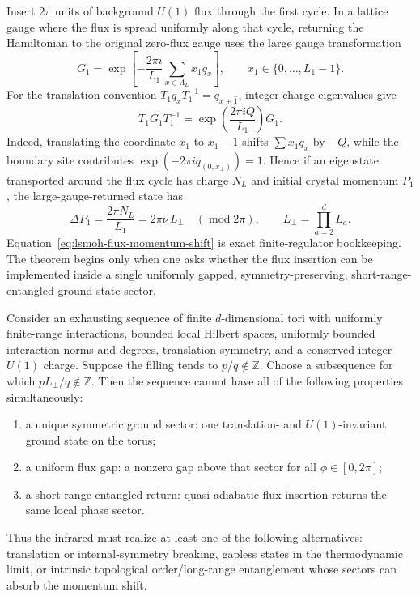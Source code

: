 Insert \(2\pi\) units of background \(U(1)\) flux through the first cycle.  In a
lattice gauge where the flux is spread uniformly along that cycle, returning
the Hamiltonian to the original zero-flux gauge uses the large gauge
transformation
\begin{equation}
  G_1
  =
  \exp\!\left[
    -\frac{2\pi i}{L_1}
    \sum_{x\in\Lambda_L}x_1 q_x
  \right],
  \qquad x_1\in\{0,\ldots,L_1-1\}.
  \label{eq:lsmoh-large-gauge-transformation}
\end{equation}
For the translation convention \(T_1q_xT_1^{-1}=q_{x+\widehat 1}\), integer
charge eigenvalues give
\begin{equation}
  T_1G_1T_1^{-1}
  =
  \exp\!\left(\frac{2\pi iQ}{L_1}\right)G_1 .
  \label{eq:lsmoh-translation-large-gauge-commutator}
\end{equation}
Indeed, translating the coordinate \(x_1\) to \(x_1-1\) shifts
\(\sum x_1q_x\) by \(-Q\), while the boundary site contributes
\(\exp(-2\pi i q_{(0,x_\perp)})=1\).  Hence if an eigenstate transported around
the flux cycle has charge \(N_L\) and initial crystal momentum \(P_1\), the
large-gauge-returned state has
\begin{equation}
  \Delta P_1
  =
  \frac{2\pi N_L}{L_1}
  =
  2\pi\nu\,L_\perp
  \quad(\operatorname{mod}2\pi),
  \qquad
  L_\perp=\prod_{a=2}^d L_a .
  \label{eq:lsmoh-flux-momentum-shift}
\end{equation}
Equation~\eqref{eq:lsmoh-flux-momentum-shift} is exact finite-regulator
bookkeeping.  The theorem begins only when one asks whether the flux insertion
can be implemented inside a single uniformly gapped, symmetry-preserving,
short-range-entangled ground-state sector.

\begin{theorem}
\label{thm:lsmoh-obstruction-theorem-boundary}
Consider an exhausting sequence of finite \(d\)-dimensional tori with uniformly
finite-range interactions, bounded local Hilbert spaces, uniformly bounded
interaction norms and degrees, translation symmetry, and a conserved integer
\(U(1)\) charge.  Suppose the filling tends to \(p/q\notin\mathbb Z\).  Choose a
subsequence for which \(pL_\perp/q\notin\mathbb Z\).  Then the sequence cannot
have all of the following properties simultaneously:
\begin{enumerate}[label=\textnormal{(\roman*)}]
\item a unique symmetric ground sector: one translation- and
  \(U(1)\)-invariant ground state on the torus;
\item a uniform flux gap: a nonzero gap above that sector for all
  \(\phi\in[0,2\pi]\);
\item a short-range-entangled return: quasi-adiabatic flux insertion returns the
  same local phase sector.
\end{enumerate}
Thus the infrared must realize at least one of the following alternatives:
translation or internal-symmetry breaking, gapless states in the thermodynamic
limit, or intrinsic topological order/long-range entanglement whose sectors can
absorb the momentum shift.
\end{theorem}

